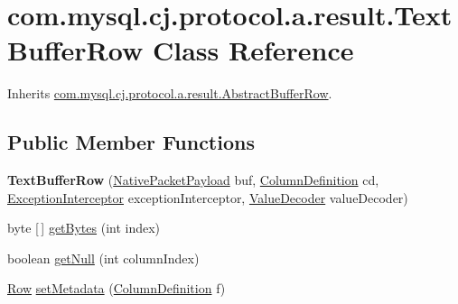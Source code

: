 \hypertarget{classcom_1_1mysql_1_1cj_1_1protocol_1_1a_1_1result_1_1_text_buffer_row}{}\section{com.\+mysql.\+cj.\+protocol.\+a.\+result.\+Text\+Buffer\+Row Class Reference}
\label{classcom_1_1mysql_1_1cj_1_1protocol_1_1a_1_1result_1_1_text_buffer_row}


Inherits \mbox{\hyperlink{classcom_1_1mysql_1_1cj_1_1protocol_1_1a_1_1result_1_1_abstract_buffer_row}{com.\+mysql.\+cj.\+protocol.\+a.\+result.\+Abstract\+Buffer\+Row}}.

\subsection*{Public Member Functions}
\begin{DoxyCompactItemize}
\item 
\mbox{\label{classcom_1_1mysql_1_1cj_1_1protocol_1_1a_1_1result_1_1_text_buffer_row_aa8590ac608223c7b5411e9a43fa8a40e}} 
{\bfseries Text\+Buffer\+Row} (\mbox{\hyperlink{classcom_1_1mysql_1_1cj_1_1protocol_1_1a_1_1_native_packet_payload}{Native\+Packet\+Payload}} buf, \mbox{\hyperlink{interfacecom_1_1mysql_1_1cj_1_1protocol_1_1_column_definition}{Column\+Definition}} cd, \mbox{\hyperlink{interfacecom_1_1mysql_1_1cj_1_1exceptions_1_1_exception_interceptor}{Exception\+Interceptor}} exception\+Interceptor, \mbox{\hyperlink{interfacecom_1_1mysql_1_1cj_1_1protocol_1_1_value_decoder}{Value\+Decoder}} value\+Decoder)
\item 
byte \mbox{[}$\,$\mbox{]} \mbox{\hyperlink{classcom_1_1mysql_1_1cj_1_1protocol_1_1a_1_1result_1_1_text_buffer_row_a54253c1dda65ca0c96dc3ca1adf4b908}{get\+Bytes}} (int index)
\item 
boolean \mbox{\hyperlink{classcom_1_1mysql_1_1cj_1_1protocol_1_1a_1_1result_1_1_text_buffer_row_a7539d7bd87e15e6e315e67f7cc535aa6}{get\+Null}} (int column\+Index)
\item 
\mbox{\hyperlink{interfacecom_1_1mysql_1_1cj_1_1result_1_1_row}{Row}} \mbox{\hyperlink{classcom_1_1mysql_1_1cj_1_1protocol_1_1a_1_1result_1_1_text_buffer_row_a09f38001a62bec7e4723062fb7b1c156}{set\+Metadata}} (\mbox{\hyperlink{interfacecom_1_1mysql_1_1cj_1_1protocol_1_1_column_definition}{Column\+Definition}} f)
\end{DoxyCompactItemize}
